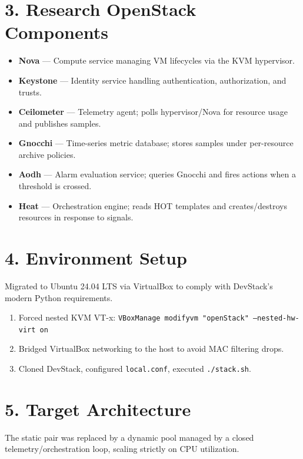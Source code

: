 \documentclass[10pt,a4paper]{article}
\begin{document}
\section*{3. Research OpenStack Components}
\begin{itemize}
    \item \textbf{Nova} --- Compute service managing VM lifecycles via the KVM hypervisor.
    \item \textbf{Keystone} --- Identity service handling authentication, authorization, and trusts.
    \item \textbf{Ceilometer} --- Telemetry agent; polls hypervisor/Nova for resource usage and publishes samples.
    \item \textbf{Gnocchi} --- Time-series metric database; stores samples under per-resource archive policies.
    \item \textbf{Aodh} --- Alarm evaluation service; queries Gnocchi and fires actions when a threshold is crossed.
    \item \textbf{Heat} --- Orchestration engine; reads HOT templates and creates/destroys resources in response to signals.
\end{itemize}

\section*{4. Environment Setup}
Migrated to Ubuntu 24.04 LTS via VirtualBox to comply with DevStack's modern Python requirements.
\begin{enumerate}
    \item Forced nested KVM VT-x: \texttt{VBoxManage modifyvm "openStack" --nested-hw-virt on}
    \item Bridged VirtualBox networking to the host to avoid MAC filtering drops.
    \item Cloned DevStack, configured \texttt{local.conf}, executed \texttt{./stack.sh}.
\end{enumerate}

\section*{5. Target Architecture}
The static pair was replaced by a dynamic pool managed by a closed telemetry/orchestration loop, scaling strictly on CPU utilization.
\end{document}
